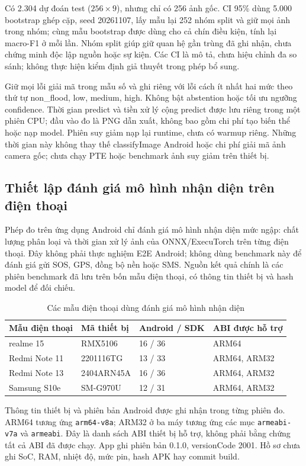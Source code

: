Có 2.304 dự đoán test ($256\times9$), nhưng chỉ có 256 ảnh gốc. CI 95\% dùng 5.000 bootstrap ghép cặp, seed 20261107, lấy mẫu lại 252 nhóm split và giữ mọi ảnh trong nhóm; cùng mẫu bootstrap được dùng cho cả chín điều kiện, tính lại macro-F1 ở mỗi lần. Nhóm split giúp giữ quan hệ gần trùng đã ghi nhận, chưa chứng minh độc lập nguồn hoặc sự kiện. Các CI là mô tả, chưa hiệu chỉnh đa so sánh; không thực hiện kiểm định giả thuyết trong phép bổ sung.

Giữ mọi lỗi giải mã trong mẫu số và ghi riêng với lỗi cách ít nhất hai mức theo thứ tự non\_flood, low, medium, high. Không bật abstention hoặc tối ưu ngưỡng confidence. Thời gian predict và tiền xử lý cộng predict được lưu riêng trong một phiên CPU; đầu vào đo là PNG dẫn xuất, không bao gồm chi phí tạo biến thể hoặc nạp model. Phiên suy giảm nạp lại runtime, chưa có warmup riêng. Những thời gian này không thay thế classifyImage Android hoặc chi phí giải mã ảnh camera gốc; chưa chạy PTE hoặc benchmark ảnh suy giảm trên thiết bị.

\subsection{Thiết lập đánh giá mô hình nhận diện trên điện thoại}\label{sec:phone-benchmark-setup}
Phép đo trên ứng dụng Android chỉ đánh giá mô hình nhận diện mức ngập: chất lượng phân loại và thời gian xử lý ảnh của ONNX/ExecuTorch trên từng điện thoại. Đây không phải thực nghiệm E2E Android; không dùng benchmark này để đánh giá gửi SOS, GPS, đồng bộ nền hoặc SMS. Nguồn kết quả chính là các phiên benchmark đã lưu trên bốn mẫu điện thoại, có thông tin thiết bị và hash model để đối chiếu.

\begin{table}[htbp]\centering
\caption{Các mẫu điện thoại dùng đánh giá mô hình nhận diện}
\label{tab:phone-benchmark-devices}
\begin{tabular}{P{.27\textwidth}P{.24\textwidth}P{.18\textwidth}P{.18\textwidth}}
\toprule Mẫu điện thoại & Mã thiết bị & Android / SDK & ABI được hỗ trợ \\
\midrule
realme 15 & RMX5106 & 16 / 36 & ARM64 \\
Redmi Note 11 & 2201116TG & 13 / 33 & ARM64, ARM32 \\
Redmi Note 13 & 2404ARN45A & 16 / 36 & ARM64, ARM32 \\
Samsung S10e & SM-G970U & 12 / 31 & ARM64, ARM32 \\
\bottomrule
\end{tabular}
\end{table}
Thông tin thiết bị và phiên bản Android được ghi nhận trong từng phiên đo. ARM64 tương ứng \texttt{arm64-v8a}; ARM32 ở ba máy tương ứng các mục \texttt{armeabi-v7a} và \texttt{armeabi}. Đây là danh sách ABI thiết bị hỗ trợ, không phải bằng chứng tất cả ABI đã được chạy. App ghi phiên bản 0.1.0, versionCode 2001. Hồ sơ chưa ghi SoC, RAM, nhiệt độ, mức pin, hash APK hay commit build.

